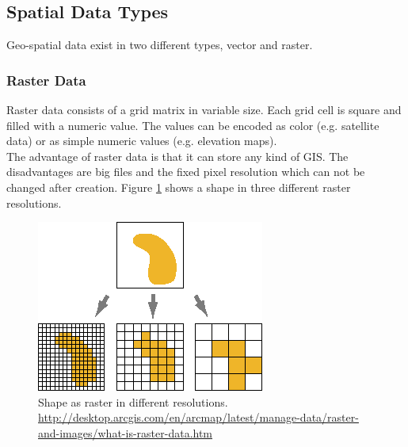 \subsection{Spatial Data Types}
Geo-spatial data exist in two different types, vector and raster. 

\subsubsection{Raster Data}
 Raster data consists of a grid matrix in variable size.  Each grid cell is square and filled with a numeric value. The values can be encoded as color (e.g. satellite data) or as simple numeric values (e.g. elevation maps).  \\
 The advantage of raster data is that it can store any kind of GIS. The disadvantages are big files and the fixed pixel resolution which can not be changed after creation. Figure \ref{img:raster} shows a shape in three different raster resolutions.
 \begin{figure}[H]
 	\centering\includegraphics[width=.5\textwidth]{res/Vector-Raster}
 	\caption{Shape as raster in different resolutions. \url{http://desktop.arcgis.com/en/arcmap/latest/manage-data/raster-and-images/what-is-raster-data.htm}}
 	\label{img:raster}
 \end{figure}

